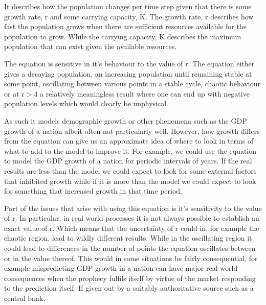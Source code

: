 \documentclass[11pt,a4paper]{CLabBookTemplate} %
\begin{document}
It describes how the population changes per time step given that there is some growth rate, r and some carrying capacity, K. The growth rate, r describes how fast the population grows when there are sufficient resources available for the population to grow. While the carrying capacity, K describes the maximum population that can exist given the available resources. \par
The equation is sensitive in it's behaviour to the value of r. The equation either gives a decaying population, an increasing population until remaining stable at some point, oscillating between various points in a stable cycle, chaotic behaviour or at r$>$4 a relatively meaningless result where one can end up with negative population levels which would clearly be unphysical. \par
As such it models demographic growth or other phenomena such as the GDP growth of a nation albeit often not particularly well. However, how growth differs from the equation can give us an approximate idea of where to look in terms of what to add to the model to improve it. For example, we could use the equation to model the GDP growth of a nation for periodic intervals of years. If the real results are less than the model we could expect to look for some external factors that inhibited growth while if it is more than the model we could expect to look for something that increased growth in that time period. \par
Part of the issues that arise with using this equation is it's sensitivity to the value of r. In particular, in real world processes it is not always possible to establish an exact value of r. Which means that the uncertainty of r could in, for example the chaotic region, lead to wildly different results. While in the oscillating region it could lead to differences in the number of points the equation oscillates between or in the value thereof. This would in some situations be fairly consequential, for example mispredicting GDP growth in a nation can have major real world consequences when the prophecy fulfils itself by virtue of the market responding to the prediction itself. If given out by a suitably authoritative source such as a central bank. \par 
\end{document}
